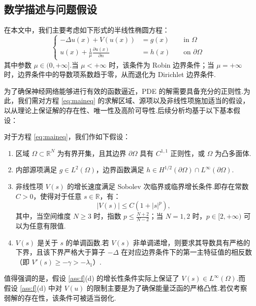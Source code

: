 \subsection{数学描述与问题假设}
在本文中，我们主要考虑如下形式的半线性椭圆方程：
\begin{equation}\label{eq:maineq}
\left\{\begin{aligned}
-\Delta u(x)+V\left(u(x)\right) &=g(x) & & \text { in } \Omega \\
 u(x) + \frac{1}{\mu}\frac{\partial u(x)}{\partial n} &=h(x) & & \text { on } \partial \Omega
\end{aligned}\right.
\end{equation}
其中参数 $\mu \in (0,+\infty]$.当 $\mu < +\infty$ 时，该条件为 Robin 边界条件；当 $\mu = +\infty$ 时，边界条件中的导数项系数趋于零，从而退化为 Dirichlet 边界条件.

为了确保神经网络能够进行有效的函数逼近，PDE 的解需要具备充分的正则性.为此，我们需对方程 \eqref{eq:maineq} 的求解区域、源项以及非线性项施加适当的假设，以从理论上保证解的存在性、唯一性及高阶可导性.后续分析均基于以下基本假设：
\begin{assumption}[正则性条件]\label{ass:f}
对于方程 \ref{eq:maineq}，我们作如下假设：
\begin{enumerate}
\item[(a)] 区域 $\Omega \subset \mathbb{R}^N$ 为有界开集，且其边界 $\partial \Omega$ 具有 $C^{1,1}$ 正则性，或 $\Omega$ 为凸多面体.
\item[(b)] 内部源项满足 $g \in L^2(\Omega)$，边界函数满足 $h \in H^{1/2}(\partial \Omega)\cap L^{\infty}(\partial \Omega)$.
\item[(c)] 非线性项 $V(s)$ 的增长速度满足 Sobolev 次临界或临界增长条件.即存在常数 $C > 0$，使得对于任意 $s \in \mathbb{R}$，有：
$$|V(s)| \le C(1 + |s|^p),$$
其中，当空间维度 $N \ge 3$ 时，指数 $p \le \frac{N+2}{N-2}$；当 $N=1, 2$ 时，$p \in [2, +\infty)$ 可以为任意有限值.
\item[(d)] $V(s)$ 是关于 $s$ 的单调函数.若 $V(s)$ 非单调递增，则要求其导数具有严格的下界，且该下界严格大于算子 $-\Delta$ 在对应边界条件下的第一主特征值的相反数（即 $V'(s) \ge -\gamma > -\lambda_1$）.
\end{enumerate}
\end{assumption}

值得强调的是，假设 \ref{ass:f}(d) 的增长性条件实际上保证了 $V(s)\in L^{\infty}(\Omega)$.而假设 \ref{ass:f}(d) 中对 $V(u)$ 的限制主要是为了确保能量泛函的严格凸性.若仅考察弱解的存在性，该条件可被适当弱化.

